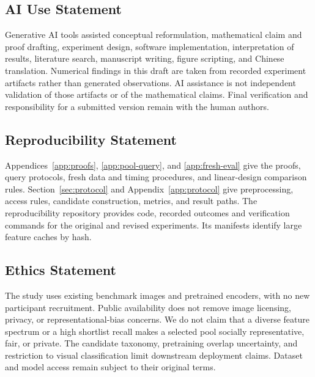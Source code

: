 \subsection*{AI Use Statement}
Generative AI tools assisted conceptual reformulation, mathematical claim and proof drafting, experiment design, software implementation, interpretation of results, literature search, manuscript writing, figure scripting, and Chinese translation. Numerical findings in this draft are taken from recorded experiment artifacts rather than generated observations. AI assistance is not independent validation of those artifacts or of the mathematical claims. Final verification and responsibility for a submitted version remain with the human authors.

\subsection*{Reproducibility Statement}
Appendices~\ref{app:proofs}, \ref{app:pool-query}, and \ref{app:fresh-eval} give the proofs, query protocols, fresh data and timing procedures, and linear-design comparison rules. Section~\ref{sec:protocol} and Appendix~\ref{app:protocol} give preprocessing, access rules, candidate construction, metrics, and result paths. The reproducibility repository provides code, recorded outcomes and verification commands for the original and revised experiments. Its manifests identify large feature caches by hash.

\subsection*{Ethics Statement}
The study uses existing benchmark images and pretrained encoders, with no new participant recruitment. Public availability does not remove image licensing, privacy, or representational-bias concerns. We do not claim that a diverse feature spectrum or a high shortlist recall makes a selected pool socially representative, fair, or private. The candidate taxonomy, pretraining overlap uncertainty, and restriction to visual classification limit downstream deployment claims. Dataset and model access remain subject to their original terms.
